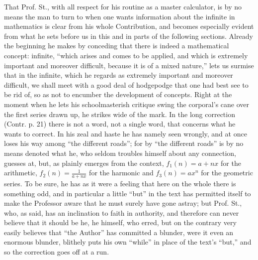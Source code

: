 \documentclass[12pt,a4paper,openany]{book}
\newcommand{\opage}[1]{\marginnote{\footnotesize\textit{[#1]}}}
\begin{document}
\opage{38}\setcounter{footnote}{0}%
That Prof. St., with all respect for his routine
as a master calculator, is by no means the man to turn to when one wants information about the infinite in mathematics is clear from his whole Contribution, and becomes
especially evident from what he sets before us in this and in parts of the following sections. Already the beginning he
makes by conceding that there is indeed a mathematical
concept: infinite, ``which arises and comes to be applied,
and which is extremely important and moreover difficult, because it is
of a mixed nature,'' lets us surmise that in the infinite, which he
regards as extremely important and moreover difficult, we shall meet with
a good deal of hodgepodge that one had best see to be rid of, so as
not to encumber the development of concepts. Right at the moment when he lets his
schoolmasterish critique swing the corporal's cane over the first
series drawn up, he strikes wide of the mark. In the long correction (Contr.
p. 21) there is not a word, not a single word, that concerns
what he wants to correct. In his zeal and haste he has namely seen
wrongly, and at once loses his way among ``the different roads''; for by
``the different roads'' is by no means denoted what he, who seldom troubles himself about any connection, guesses at, but,
as plainly emerges from the context, $f_{1}(n) = a + nx$
for the arithmetic, $f_{2}(n) = \frac{1}{a + nx}$ for the harmonic and
$f_{3}(n) = ax^{n}$ for the geometric series. To be sure, he has
as it were a feeling that here on the whole there is something odd, and in particular a little ``but'' in the text has permitted itself
to make the Professor aware that he must surely have
gone astray; but Prof. St., who, as said, has
an inclination to faith in authority, and therefore can never believe that it
should be he, he himself, who erred, but on the contrary very
easily believes that ``the Author'' has committed a blunder, were it even %
an enormous blunder, blithely puts his own ``while'' in place of the
text's ``but,'' and so the correction goes off at a run.
\end{document}
